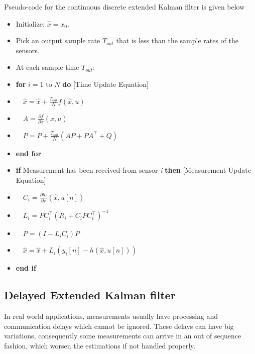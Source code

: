 Pseudo-code for the continuous discrete extended Kalman filter is given below
\renewcommand{\labelitemi}{$\cdot$}
\begin{itemize}[nosep]
\item Initialize: $ \hat{x}=x_0 $.
\item Pick an output sample rate $T_{out}$ that is less than the sample rates of the sensors.
\item At each sample time $T_{out}$:

\item \textbf{for} $ i=1 $ to $ N $ \textbf{do} [Time Update Equation]
\item $ \quad \hat{x} = \hat{x} + \frac{T_{out}}{N}f(\hat{x},u) $
\item $ \quad A = \frac{\partial f}{\partial x}(\hat{x},u)$
\item $ \quad P=P+\frac{T_{out}}{N}(AP+PA^\top+Q) $
\item \textbf{end for}
\item \textbf{if} Measurement has been received from sensor \textit{i} \textbf{then} [Measurement Update Equation]
\item $ \quad C_i=\frac{\partial h_i}{\partial x}(\hat{x},u[n])$
\item $ \quad L_i=PC_i^\top(R_i+C_i P C_i^\top)^{-1}$
\item $ \quad P=(I-L_iC_i)P$
\item $ \quad \hat{x}=\hat{x}+L_i(y_i[n]-h(\hat{x},u[n]))$
\item \textbf{end if}
\end{itemize}

\subsection{Delayed Extended Kalman filter}{\label{sub:DEKF}}
In real world applications, measurements usually have processing and communication delays which cannot be ignored. These delays can have big variations, consequently some measurements can arrive in an out of sequence fashion, which worsen the estimations if not handled properly.

